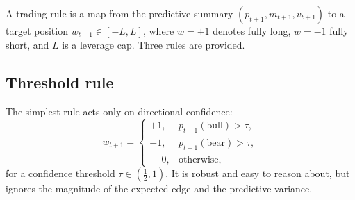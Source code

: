 \documentclass[11pt]{article}
\theoremstyle{plain}
\theoremstyle{definition}
\theoremstyle{remark}
\begin{document}
A trading rule is a map from the predictive summary $(p_{t+1},m_{t+1},v_{t+1})$
to a target position $w_{t+1}\in[-L,L]$, where $w=+1$ denotes fully long, $w=-1$
fully short, and $L$ is a leverage cap. Three rules are provided.

\subsection{Threshold rule}
The simplest rule acts only on directional confidence:
\begin{equation}
  w_{t+1} =
  \begin{cases}
    +1, & p_{t+1}(\text{bull}) > \tau,\\
    -1, & p_{t+1}(\text{bear}) > \tau,\\
    \phantom{+}0, & \text{otherwise,}
  \end{cases}
\end{equation}
for a confidence threshold $\tau\in(\tfrac12,1)$. It is robust and easy to reason
about, but ignores the magnitude of the expected edge and the predictive
variance.
\end{document}
